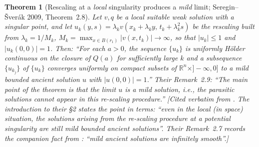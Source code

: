 \documentclass[11pt]{article}
\newtheorem{theorem}{Theorem}[section]
\theoremstyle{definition}
\theoremstyle{remark}
\newcommand{\R}{\mathbb{R}}
\begin{document}
\begin{theorem}[Rescaling at a \emph{local} singularity produces a
  \emph{mild} limit; Seregin--\v{S}ver\'ak 2009, Theorem~2.8]
  \label{thm:s48-SS}
  Let $v,q$ be a local suitable weak solution with a singular point, and let
  $u_k(y,s)=\lambda_kv(x_k+\lambda_ky,\,t_k+\lambda_k^2s)$ be the rescaling
  built from $\lambda_k=1/M_k$, $M_k=\max_{x\in B(r_1)}|v(x,t_k)|\to\infty$,
  so that $|u_k|\leq1$ and $|u_k(0,0)|=1$. Then: ``For each $a>0$, the
  sequence $\{u_k\}$ is uniformly H\"older continuous on the closure of $Q(a)$
  for sufficiently large $k$ and a subsequence $\{u_{k_j}\}$ of $\{u_k\}$
  converges uniformly on compact subsets of $\R^n\times{]}-\infty,0]$ to a
  mild bounded ancient solution $u$ with $|u(0,0)|=1$.''
  Their Remark~2.9: ``The main point of the theorem is that the limit $u$ is a
  mild solution, i.e., \emph{the parasitic solutions cannot appear in this
  re-scaling procedure}.''
  \emph{[Cited verbatim from \cite[Thm.~2.8, Rem.~2.9]{SereginSverak2009}.
  The introduction to their \S2 states the point in terms:
  ``even in the local (in space) situation, the solutions arising from the
  re-scaling procedure at a potential singularity are still mild bounded
  ancient solutions''. Their Remark~2.7 records the companion fact from
  \cite{KNSS2009}: ``mild ancient solutions are infinitely smooth''.]}
\end{theorem}
\end{document}
